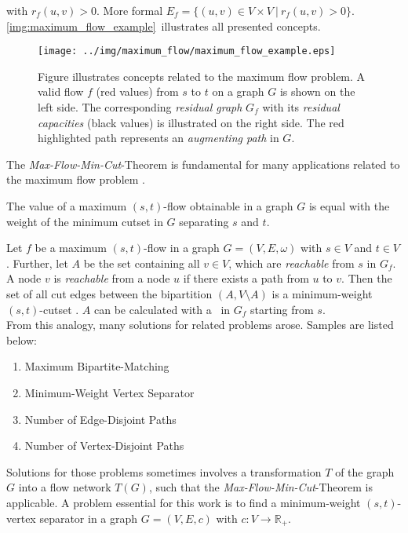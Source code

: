 with $r_f(u,v) > 0$. More formal $E_f = \{(u,v) \in V \times V\ |\ r_f(u,v) > 0\}$.
\autoref{img:maximum_flow_example}~illustrates all presented concepts. \\
\begin{figure}
\centering
\texttt{[image: ../img/maximum\_flow/maximum\_flow\_example.eps]}
\caption{Figure illustrates concepts related to the maximum flow problem. A valid flow $f$ 
(red values) from $s$ to $t$ on a graph $G$ is shown on the left side. The corresponding
\emph{residual graph} $G_f$ with its \emph{residual capacities} (black values) 
is illustrated on the right side. The red highlighted path represents an \emph{augmenting path}
in $G$.}
\label{img:maximum_flow_example}
\end{figure}
The \emph{Max-Flow-Min-Cut}-Theorem is fundamental for many applications related to the maximum
flow problem \cite{ford1956maximal}.

\begin{theorem}
The value of a maximum $(s,t)$-flow obtainable in a graph $G$ is equal with the weight
of the minimum cutset in $G$ separating $s$ and $t$.
\end{theorem}

Let $f$ be a maximum $(s,t)$-flow in a graph $G = (V,E,\omega)$ with $s \in V$ and $t \in V$. 
Further, let $A$ be the set containing all $v \in V$, which are \emph{reachable} from $s$
in $G_f$. A node $v$ is \emph{reachable} from a node $u$ if there exists a path from $u$
to $v$. Then the set of all cut edges between the bipartition $(A,V\setminus A)$ 
is a minimum-weight $(s,t)$-cutset \cite{ford2015flows}. $A$ can be calculated with a \BFS~in $G_f$ starting
from $s$. \\
From this analogy, many solutions for related problems arose. Samples are listed below:
\begin{enumerate}
\item Maximum Bipartite-Matching
\item Minimum-Weight Vertex Separator
\item Number of Edge-Disjoint Paths
\item Number of Vertex-Disjoint Paths
\end{enumerate}
Solutions for those problems sometimes involves a transformation $T$ of the graph $G$
into a flow network $T(G)$, such that the \emph{Max-Flow-Min-Cut}-Theorem is applicable. 
A problem essential for this work is to find a minimum-weight $(s,t)$-vertex separator
in a graph $G = (V,E,c)$ with $c: V \rightarrow \mathbb{R}_+$.

